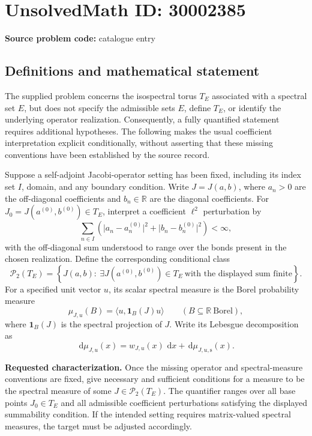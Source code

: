 \documentclass[11pt]{article}
\newcommand{\R}{\mathbb{R}}
\newcommand{\dd}{\,\mathrm{d}}
\begin{document}
\section*{UnsolvedMath ID: 30002385}
\textbf{Source problem code:} catalogue entry
\subsection{Definitions and mathematical statement}
The supplied problem concerns the isospectral torus \(T_E\) associated with a spectral set \(E\), but does not specify the admissible sets \(E\), define \(T_E\), or identify the underlying operator realization. Consequently, a fully quantified statement requires additional hypotheses. The following makes the usual coefficient interpretation explicit conditionally, without asserting that these missing conventions have been established by the source record.

Suppose a self-adjoint Jacobi-operator setting has been fixed, including its index set \(I\), domain, and any boundary condition. Write \(J=J(a,b)\), where \(a_n>0\) are the off-diagonal coefficients and \(b_n\in\R\) are the diagonal coefficients. For \(J_0=J(a^{(0)},b^{(0)})\in T_E\), interpret a coefficient \(\ell^2\) perturbation by
\[
 \sum_{n\in I}\left(\lvert a_n-a_n^{(0)}\rvert^2+\lvert b_n-b_n^{(0)}\rvert^2\right)<\infty,
\]
with the off-diagonal sum understood to range over the bonds present in the chosen realization. Define the corresponding conditional class
\[
 \mathcal P_2(T_E)=\left\{J(a,b):\ \exists J(a^{(0)},b^{(0)})\in T_E\ \text{with the displayed sum finite}\right\}.
\]
For a specified unit vector \(u\), its scalar spectral measure is the Borel probability measure
\[
 \mu_{J,u}(B)=\langle u,\mathbf 1_B(J)u\rangle
 \qquad(B\subseteq\R\ \text{Borel}),
\]
where \(\mathbf 1_B(J)\) is the spectral projection of \(J\). Write its Lebesgue decomposition as
\[
 \dd\mu_{J,u}(x)=w_{J,u}(x)\,\dd x+\dd\mu_{J,u,\mathrm s}(x).
\]

\textbf{Requested characterization.} Once the missing operator and spectral-measure conventions are fixed, give necessary and sufficient conditions for a measure to be the spectral measure of some \(J\in\mathcal P_2(T_E)\). The quantifier ranges over all base points \(J_0\in T_E\) and all admissible coefficient perturbations satisfying the displayed summability condition. If the intended setting requires matrix-valued spectral measures, the target must be adjusted accordingly.
\end{document}
